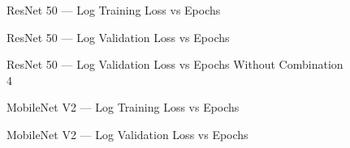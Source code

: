 \documentclass[10pt, conference]{IEEEtran}
\begin{document}
\begin{table}[H]
    \centering
    \caption{Hyper-Parameter Combinations}\label{table:HyperParamCombinations}
\end{table}


\begin{figure}[H]
    \centering
    
    \caption{ResNet 50 --- Log Training Loss vs Epochs}
\end{figure}

\begin{figure}[H]
    \centering
    
    \caption{ResNet 50 --- Log Validation Loss vs Epochs}
\end{figure}


\begin{figure}[H]
    \centering
    
    \caption{\centering ResNet 50 --- Log Validation Loss vs Epochs Without Combination 4}
\end{figure}


\begin{figure}[H]
    \centering
    
    \caption{MobileNet V2 --- Log Training Loss vs Epochs}
\end{figure}

\begin{figure}[H]
    \centering
    
    \caption{MobileNet V2 --- Log Validation Loss vs Epochs}
\end{figure}
\end{document}
